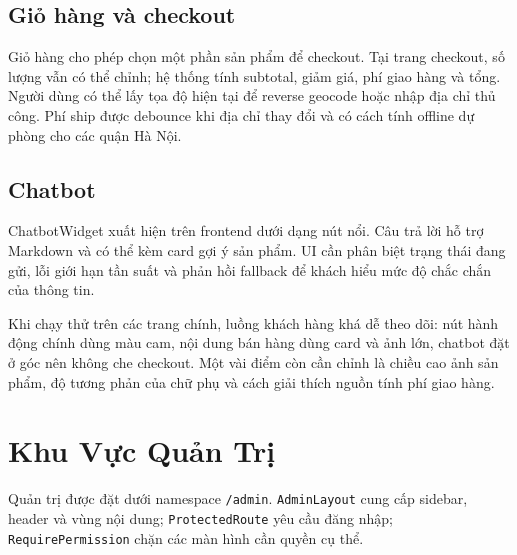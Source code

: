 \subsection{Giỏ hàng và checkout}

Giỏ hàng cho phép chọn một phần sản phẩm để checkout. Tại trang checkout, số lượng vẫn có thể chỉnh; hệ thống tính subtotal, giảm giá, phí giao hàng và tổng. Người dùng có thể lấy tọa độ hiện tại để reverse geocode hoặc nhập địa chỉ thủ công. Phí ship được debounce khi địa chỉ thay đổi và có cách tính offline dự phòng cho các quận Hà Nội.

\subsection{Chatbot}

ChatbotWidget xuất hiện trên frontend dưới dạng nút nổi. Câu trả lời hỗ trợ Markdown và có thể kèm card gợi ý sản phẩm. UI cần phân biệt trạng thái đang gửi, lỗi giới hạn tần suất và phản hồi fallback để khách hiểu mức độ chắc chắn của thông tin.

Khi chạy thử trên các trang chính, luồng khách hàng khá dễ theo dõi: nút hành động chính dùng màu cam, nội dung bán hàng dùng card và ảnh lớn, chatbot đặt ở góc nên không che checkout. Một vài điểm còn cần chỉnh là chiều cao ảnh sản phẩm, độ tương phản của chữ phụ và cách giải thích nguồn tính phí giao hàng.

\section{Khu Vực Quản Trị}

Quản trị được đặt dưới namespace \texttt{/admin}. \texttt{AdminLayout} cung cấp sidebar, header và vùng nội dung; \texttt{ProtectedRoute} yêu cầu đăng nhập; \texttt{RequirePermission} chặn các màn hình cần quyền cụ thể.

